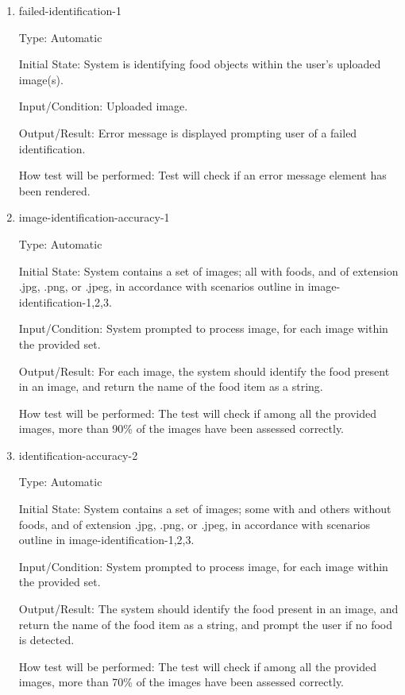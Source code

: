 \documentclass[12pt, titlepage]{article}
\begin{document}
	\begin{enumerate}
		
		\item{failed-identification-1\\}
		
		Type: Automatic
		
		Initial State: System is identifying food objects within the user's 
		uploaded image(s).
		
		Input/Condition: Uploaded image.
		
		Output/Result: Error message is displayed prompting user of a failed 
		identification.
		
		How test will be performed: Test will check if an error message element 
		has been rendered.
		
		\item{image-identification-accuracy-1\\}
		
		Type: Automatic
		
		Initial State: System contains a set of images; all with foods, and of 
		extension .jpg, .png, or .jpeg, in accordance with scenarios outline in 
		image-identification-1,2,3.
		
		Input/Condition: System prompted to process image, for each image 
		within the provided set.
		
		Output/Result: For each image, the system should identify the food 
		present in an image, and return the name of the food item as a string.
		
		How test will be performed: The test will check if among all the 
		provided images, more than 90\% of the images have been assessed 
		correctly.
		
		\item{identification-accuracy-2\\}
		
		Type: Automatic
		
		Initial State: System contains a set of images; some with and others 
		without foods, and of extension .jpg, .png, or 
		.jpeg, in accordance with scenarios outline in 
		image-identification-1,2,3.
		
		Input/Condition: System prompted to process image, for each image 
		within the provided set.
		
		Output/Result: The system should identify the food present in an image, 
		and return the name of the food item as a string, and prompt the user 
		if no food is detected.
		
		How test will be performed: The test will check if among all the 
		provided images, more than 70\% of the images have been assessed 
		correctly.
		

\end{enumerate}
\end{document}
